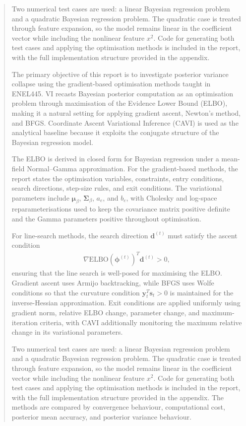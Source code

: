 \documentclass[11pt,a4paper]{article}
\newcommand{\ELBO}{\text{ELBO}}
\begin{document}
\begin{abstract}
Two numerical test cases are used: a linear Bayesian regression problem and a quadratic Bayesian regression problem. The quadratic case is treated through feature expansion, so the model remains linear in the coefficient vector while including the nonlinear feature $x^2$. Code for generating both test cases and applying the optimisation methods is included in the report, with the full implementation structure provided in the appendix.






The primary objective of this report is to investigate posterior variance collapse using the gradient-based optimisation methods taught in ENEL445. VI recasts Bayesian posterior computation as an optimisation problem through maximisation of the Evidence Lower Bound (ELBO), making it a natural setting for applying gradient ascent, Newton's method, and BFGS. Coordinate Ascent Variational Inference (CAVI) is used as the analytical baseline because it exploits the conjugate structure of the Bayesian regression model.

The ELBO is derived in closed form for Bayesian regression under a mean-field Normal--Gamma approximation. For the gradient-based methods, the report states the optimisation variables, constraints, entry conditions, search directions, step-size rules, and exit conditions. The variational parameters include $\bm{\mu}_\beta$, $\bm{\Sigma}_\beta$, $a_e$, and $b_e$, with Cholesky and log-space reparameterisations used to keep the covariance matrix positive definite and the Gamma parameters positive throughout optimisation.

For line-search methods, the search direction $\bm{d}^{(t)}$ must satisfy the ascent condition
\begin{align*}
\nabla\ELBO(\bm{\phi}^{(t)})^T \bm{d}^{(t)} > 0,
\end{align*}
ensuring that the line search is well-posed for maximising the ELBO. Gradient ascent uses Armijo backtracking, while BFGS uses Wolfe conditions so that the curvature condition $\bm{y}_t^T\bm{s}_t>0$ is maintained for the inverse-Hessian approximation. Exit conditions are applied uniformly using gradient norm, relative ELBO change, parameter change, and maximum-iteration criteria, with CAVI additionally monitoring the maximum relative change in its variational parameters.

Two numerical test cases are used: a linear Bayesian regression problem and a quadratic Bayesian regression problem. The quadratic case is treated through feature expansion, so the model remains linear in the coefficient vector while including the nonlinear feature $x^2$. Code for generating both test cases and applying the optimisation methods is included in the report, with the full implementation structure provided in the appendix. The methods are compared by convergence behaviour, computational cost, posterior mean accuracy, and posterior variance behaviour.
\end{abstract}
\end{document}
